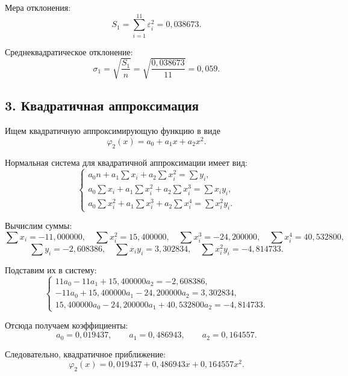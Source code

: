 \documentclass[12pt]{report}
\begin{document}
	Мера отклонения:
	\[
	S_1 = \sum_{i=1}^{11} \varepsilon_i^2 = 0,038673.
	\]
	
	Среднеквадратическое отклонение:
	\[
	\sigma_1 = \sqrt{\frac{S_1}{n}} = \sqrt{\frac{0,038673}{11}} = 0,059.
	\]
	
	\subsection*{3. Квадратичная аппроксимация}
	
	Ищем квадратичную аппроксимирующую функцию в виде
	\[
	\varphi_2(x) = a_0 + a_1x + a_2x^2.
	\]
	
	Нормальная система для квадратичной аппроксимации имеет вид:
	\[
	\begin{cases}
		a_0n + a_1\sum x_i + a_2\sum x_i^2 = \sum y_i,\\
		a_0\sum x_i + a_1\sum x_i^2 + a_2\sum x_i^3 = \sum x_i y_i,\\
		a_0\sum x_i^2 + a_1\sum x_i^3 + a_2\sum x_i^4 = \sum x_i^2 y_i.
	\end{cases}
	\]
	
	Вычислим суммы:
	\[
	\sum x_i = -11,000000, \quad
	\sum x_i^2 = 15,400000, \quad
	\sum x_i^3 = -24,200000, \quad
	\sum x_i^4 = 40,532800,
	\]
	\[
	\sum y_i = -2,608386, \quad
	\sum x_i y_i = 3,302834, \quad
	\sum x_i^2 y_i = -4,814733.
	\]
	
	Подставим их в систему:
	\[
	\begin{cases}
		11a_0 - 11a_1 + 15,400000a_2 = -2,608386,\\
		-11a_0 + 15,400000a_1 - 24,200000a_2 = 3,302834,\\
		15,400000a_0 - 24,200000a_1 + 40,532800a_2 = -4,814733.
	\end{cases}
	\]
	
	Отсюда получаем коэффициенты:
	\[
	a_0 = 0,019437, \qquad
	a_1 = 0,486943, \qquad
	a_2 = 0,164557.
	\]
	
	Следовательно, квадратичное приближение:
	\[
	\varphi_2(x) = 0,019437 + 0,486943x + 0,164557x^2.
	\]
	
\end{document}
